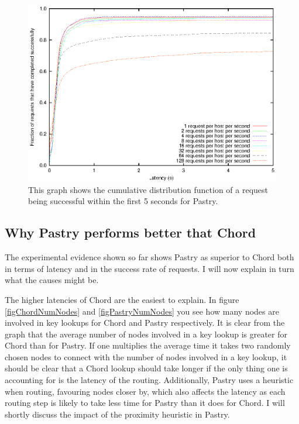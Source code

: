 \begin{figure}[!htbp]
  \begin{center}
    \includegraphics[width=0.9\linewidth]{illustrations/cdf_pastry.eps}
    \caption{This graph shows the cumulative distribution function of a request being successful within the first 5 seconds for Pastry.}
    \label{figPastryCDF}
  \end{center}
\end{figure}

\subsection{Why Pastry performs better that Chord}
The experimental evidence shown so far shows Pastry as superior to Chord both in terms of latency and in the success rate of requests. I will now explain in turn what the causes might be.

\mbox{}

The higher latencies of Chord are the easiest to explain. In figure \ref{figChordNumNodes} and \ref{figPastryNumNodes} you see how many nodes are involved in key lookups for Chord and Pastry respectively. It is clear from the graph that the average number of nodes involved in a key lookup is greater for Chord than for Pastry. If one multiplies the average time it takes two randomly chosen nodes to connect with the number of nodes involved in a key lookup, it should be clear that a Chord lookup should take longer if the only thing one is accounting for is the latency of the routing. Additionally, Pastry uses a heuristic when routing, favouring nodes closer by, which also affects the latency as each routing step is likely to take less time for Pastry than it does for Chord. I will shortly discuss the impact of the proximity heuristic in Pastry.

